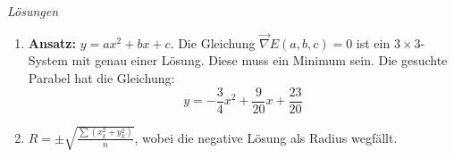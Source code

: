 \clearpage
\emph{Lösungen}
\begin{enumerate}

    \item \textbf{Ansatz:} \( y = ax^2 + bx + c \). Die Gleichung \( \vec \nabla E(a, b, c) = 0 \) ist ein \( 3 \times 3 \)-System mit genau einer Lösung. Diese muss ein Minimum sein. Die gesuchte Parabel hat die Gleichung:
    \[
    y = -\frac{3}{4}x^2 + \frac{9}{20}x + \frac{23}{20}
    \]

    \item \( R = \pm \sqrt{\frac{\sum (x_k^2 + y_k^2)}{n}} \), wobei die negative Lösung als Radius wegfällt.
\end{enumerate}